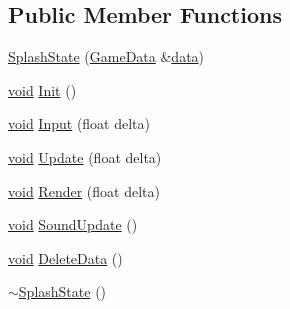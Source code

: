 \subsection*{Public Member Functions}
\begin{DoxyCompactItemize}
\item 
\hyperlink{classSplashState_a9aa258fc56874b33de72ea986bceeb62}{Splash\+State} (\hyperlink{structGameData}{Game\+Data} \&\hyperlink{imgui__impl__opengl3__loader_8h_abd87654504355b4c1bb002dcb1d4d16a}{data})
\item 
\hyperlink{imgui__impl__opengl3__loader_8h_ac668e7cffd9e2e9cfee428b9b2f34fa7}{void} \hyperlink{classSplashState_ae3e0604da087032c179593c237580988}{Init} ()
\item 
\hyperlink{imgui__impl__opengl3__loader_8h_ac668e7cffd9e2e9cfee428b9b2f34fa7}{void} \hyperlink{classSplashState_adb2eb87bd89e41af0c3a9d0903e89450}{Input} (float delta)
\item 
\hyperlink{imgui__impl__opengl3__loader_8h_ac668e7cffd9e2e9cfee428b9b2f34fa7}{void} \hyperlink{classSplashState_af19b293ae1e914e13db4382115e56d2c}{Update} (float delta)
\item 
\hyperlink{imgui__impl__opengl3__loader_8h_ac668e7cffd9e2e9cfee428b9b2f34fa7}{void} \hyperlink{classSplashState_a5efb6f0ede61ec76ee2dd72a6b24c57c}{Render} (float delta)
\item 
\hyperlink{imgui__impl__opengl3__loader_8h_ac668e7cffd9e2e9cfee428b9b2f34fa7}{void} \hyperlink{classSplashState_adff14b96ab0de144e0052326819e7f2e}{Sound\+Update} ()
\item 
\hyperlink{imgui__impl__opengl3__loader_8h_ac668e7cffd9e2e9cfee428b9b2f34fa7}{void} \hyperlink{classSplashState_aca842c8e3ea2642980569ed3b4bb362a}{Delete\+Data} ()
\item 
\hyperlink{classSplashState_a3171ebc16024564fced18948bf9d7ec5}{$\sim$\+Splash\+State} ()
\end{DoxyCompactItemize}
